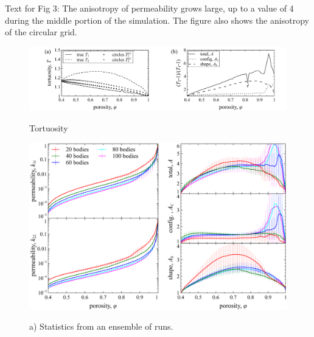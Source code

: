 \documentclass[3p]{elsarticle}
\begin{document}
Text for Fig 3: 
The anisotropy of permeability grows large, up to a value of 4 during the middle portion of the simulation. The figure also shows the anisotropy of the circular grid.

\begin{figure}%
\centering \label{fig4}
\includegraphics[width = 0.99 \textwidth]{./figs/fig4.pdf}
\caption{
Tortuosity
}
\end{figure}

\begin{figure}%
\centering \label{fig5}
\includegraphics[width = 0.99 \textwidth]{./figs/fig5.pdf}
\caption{
a) Statistics from an ensemble of runs.
}
\end{figure}
\end{document}
